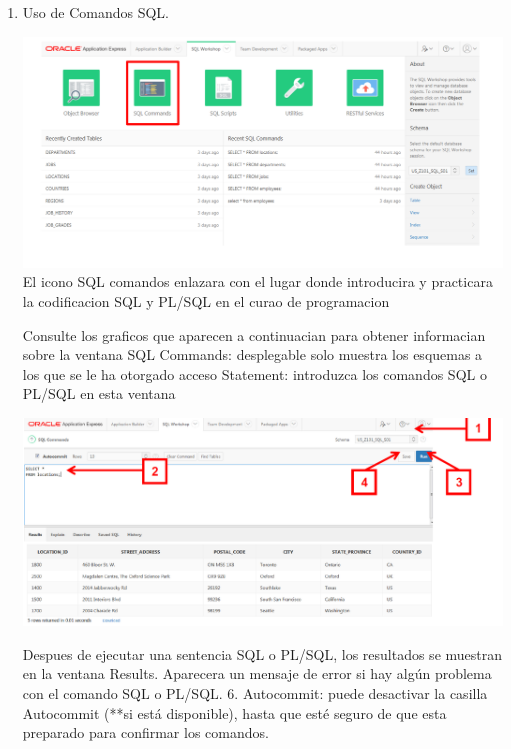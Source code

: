 \documentclass[12pt,letterpaper]{article}
\begin{document}
\begin{enumerate}[1.]
    
    
    
    \item Uso de Comandos SQL.
    
    
    \includegraphics[width=15cm]{./carolinaImagen/imagen6.png}
     El icono SQL comandos enlazara con el lugar donde introducira y practicara la codificacion SQL y PL/SQL en el curao de programacion 
      
 
      
      
      
      
      \newpage
      
Consulte los graficos que aparecen a continuacian para obtener informacian sobre la ventana SQL Commands:
 desplegable solo muestra los esquemas a los que se le ha otorgado acceso
Statement: introduzca los comandos SQL o PL/SQL en esta ventana

      \includegraphics[width=15cm]{./carolinaImagen/imagen7.png}
      
      
      
      
     Despues de ejecutar una sentencia SQL o PL/SQL, los resultados se muestran en la ventana Results. Aparecera un mensaje de error si hay algún problema con el comando SQL o PL/SQL.
6. Autocommit: puede desactivar la casilla Autocommit (**si está disponible), hasta que esté seguro de que esta preparado para confirmar los comandos.     
        

\end{enumerate}
\end{document}
